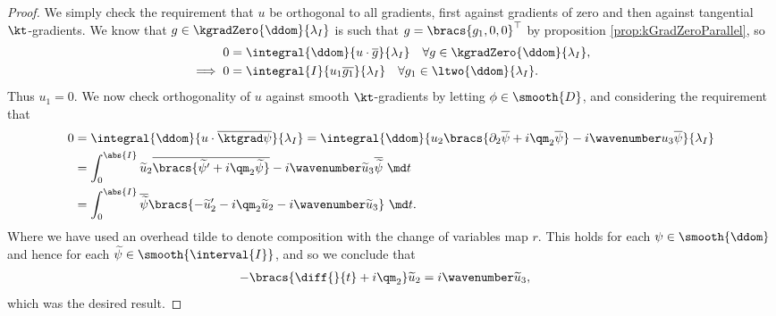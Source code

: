 \begin{proof}
	We simply check the requirement that $u$ be orthogonal to all gradients, first against gradients of zero and then against tangential $\kt$-gradients.
	We know that $g\in\kgradZero{\ddom}{\lambda_I}$ is such that $g=\bracs{g_1,0,0}^\top$ by proposition \ref{prop:kGradZeroParallel}, so
	\begin{align*}
		0 &= \integral{\ddom}{ u\cdot\overline{g} }{\lambda_I} \quad\forall g\in\kgradZero{\ddom}{\lambda_I}, \\
		\implies 0 &= \integral{I}{ u_1 \overline{g_1} }{\lambda_I} \quad \forall g_1\in\ltwo{\ddom}{\lambda_I}.
	\end{align*}
	Thus $u_1 = 0$.
	We now check orthogonality of $u$ against smooth $\kt$-gradients by letting $\phi\in\smooth{D}$, and considering the requirement that
	\begin{align*}
		0 &= \integral{\ddom}{ u\cdot\overline{\ktgrad\psi} }{\lambda_I}
		= \integral{\ddom}{u_2\bracs{\partial_2\overline{\psi} + i\qm_2\overline{\psi}} - i\wavenumber u_3\overline{\psi}}{\lambda_I} \\
		&= \int_0^{\abs{I}} \widetilde{u}_2\overline{\bracs{\widetilde{\psi}' + i\qm_2 \widetilde{\psi}}} - i\wavenumber\widetilde{u}_3\overline{\widetilde{\psi}} \ \md t \\
		&= \int_0^{\abs{I}} \overline{\widetilde{\psi}}\bracs{-\widetilde{u}'_2 - i\qm_2 \widetilde{u}_2 - i\wavenumber\widetilde{u}_3} \ \md t.
	\end{align*}
	Where we have used an overhead tilde to denote composition with the change of variables map $r$.
	This holds for each $\psi\in\smooth{\ddom}$ and hence for each $\widetilde{\psi}\in\smooth{\interval{I}}$, and so we conclude that
	\begin{align*}
		-\bracs{\diff{}{t} + i\qm_2}\widetilde{u}_2 &= i\wavenumber\widetilde{u}_3,
	\end{align*}
	which was the desired result.
\end{proof}

